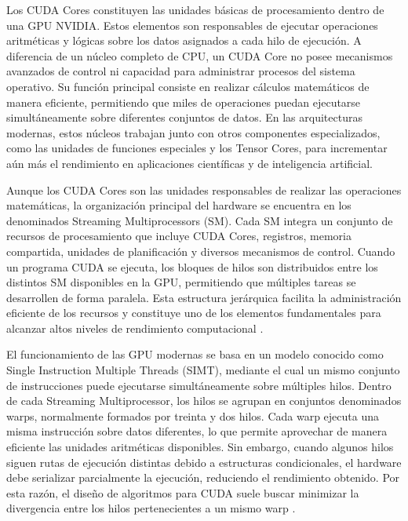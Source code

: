 Los CUDA Cores constituyen las unidades básicas de procesamiento dentro de una GPU NVIDIA. Estos elementos son responsables de ejecutar operaciones aritméticas y lógicas sobre los datos asignados a cada hilo de ejecución. A diferencia de un núcleo completo de CPU, un CUDA Core no posee mecanismos avanzados de control ni capacidad para administrar procesos del sistema operativo. Su función principal consiste en realizar cálculos matemáticos de manera eficiente, permitiendo que miles de operaciones puedan ejecutarse simultáneamente sobre diferentes conjuntos de datos. En las arquitecturas modernas, estos núcleos trabajan junto con otros componentes especializados, como las unidades de funciones especiales y los Tensor Cores, para incrementar aún más el rendimiento en aplicaciones científicas y de inteligencia artificial.

Aunque los CUDA Cores son las unidades responsables de realizar las operaciones matemáticas, la organización principal del hardware se encuentra en los denominados Streaming Multiprocessors (SM). Cada SM integra un conjunto de recursos de procesamiento que incluye CUDA Cores, registros, memoria compartida, unidades de planificación y diversos mecanismos de control. Cuando un programa CUDA se ejecuta, los bloques de hilos son distribuidos entre los distintos SM disponibles en la GPU, permitiendo que múltiples tareas se desarrollen de forma paralela. Esta estructura jerárquica facilita la administración eficiente de los recursos y constituye uno de los elementos fundamentales para alcanzar altos niveles de rendimiento computacional \cite{introduccionCUDA,investigacionCUDA}.

El funcionamiento de las GPU modernas se basa en un modelo conocido como Single Instruction Multiple Threads (SIMT), mediante el cual un mismo conjunto de instrucciones puede ejecutarse simultáneamente sobre múltiples hilos. Dentro de cada Streaming Multiprocessor, los hilos se agrupan en conjuntos denominados warps, normalmente formados por treinta y dos hilos. Cada warp ejecuta una misma instrucción sobre datos diferentes, lo que permite aprovechar de manera eficiente las unidades aritméticas disponibles. Sin embargo, cuando algunos hilos siguen rutas de ejecución distintas debido a estructuras condicionales, el hardware debe serializar parcialmente la ejecución, reduciendo el rendimiento obtenido. Por esta razón, el diseño de algoritmos para CUDA suele buscar minimizar la divergencia entre los hilos pertenecientes a un mismo warp \cite{nvidiaProgrammingGuide,investigacionCUDA}.


